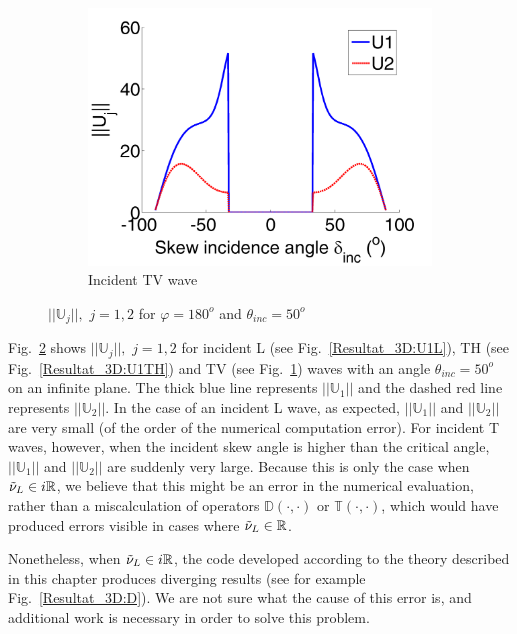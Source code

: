 \begin{figure}
\begin{subfigure}[b]{0.32\textwidth}
        \includegraphics[width=\textwidth]{images/chapter4/Resultats_3D/U1TV_180_50.png}
        \caption{Incident TV wave}
        \label{Resultat_3D:U1TV}
    \end{subfigure} 
\caption{$||\mathbb{U}_j||, \, \, j=1,2$ for $\varphi=180^o$ and $\theta_{inc}=50^o$}
\label{Resultat_3D:U1}
\end{figure}

Fig.~\ref{Resultat_3D:U1} shows $||\mathbb{U}_j||, \, \, j=1,2$ for incident L (see Fig.~\ref{Resultat_3D:U1L}), TH (see Fig.~\ref{Resultat_3D:U1TH}) and TV (see Fig.~\ref{Resultat_3D:U1TV}) waves with an angle $\theta_{inc}=50^o$ on an infinite plane. The thick blue line represents $||\mathbb{U}_1||$ and the dashed red line represents $||\mathbb{U}_2||$. In the case of an incident L wave, as expected, $||\mathbb{U}_1||$ and $||\mathbb{U}_2||$ are very small (of the order of the numerical computation error). For incident T waves, however, when the incident skew angle is higher than the critical angle, $||\mathbb{U}_1||$ and $||\mathbb{U}_2||$ are suddenly very large. Because this is only the case when $\tilde{\nu}_L \in i\mathbb{R}$, we believe that this might be an error in the numerical evaluation, rather than a miscalculation of operators $\mathbb{D}(\cdot,\cdot)$ or $\mathbb{T}(\cdot,\cdot)$, which would have produced errors visible in cases where $\tilde{\nu}_L \in \mathbb{R}$. 

Nonetheless, when $\tilde{\nu}_L \in i\mathbb{R}$, the code developed according to the theory described in this chapter produces diverging results (see for example Fig.~\ref{Resultat_3D:D}). We are not sure what the cause of this error is, and additional work is necessary in order to solve this problem.

